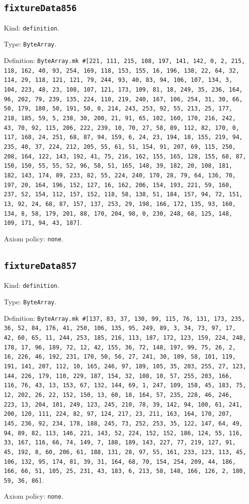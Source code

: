 \documentclass[11pt]{article}
\begin{document}
\subsection*{\texttt{fixtureData856}}
\noindent Kind: \texttt{definition}.\par
\noindent Type: \texttt{ByteArray}.\par
\noindent Definition: \texttt{ByteArray.mk \#[221, 111, 215, 108, 197, 141, 142, 0, 2, 215, 118, 162, 40, 93, 254, 169, 118, 153, 155, 16, 196, 138, 22, 64, 32, 114, 29, 118, 121, 121, 79, 244, 93, 40, 83, 94, 106, 107, 134, 3, 104, 223, 48, 23, 108, 107, 121, 173, 109, 81, 18, 249, 35, 236, 164, 96, 202, 79, 239, 135, 224, 110, 219, 240, 167, 106, 254, 31, 30, 66, 50, 179, 180, 50, 191, 50, 0, 214, 243, 253, 92, 55, 213, 25, 177, 218, 185, 59, 5, 238, 30, 200, 21, 91, 65, 102, 160, 170, 216, 242, 43, 70, 92, 115, 206, 222, 239, 10, 70, 27, 58, 89, 112, 82, 170, 0, 117, 168, 24, 251, 68, 87, 94, 159, 6, 24, 23, 194, 18, 155, 219, 94, 235, 40, 37, 224, 212, 205, 55, 61, 51, 154, 91, 207, 69, 115, 250, 208, 164, 122, 143, 192, 41, 75, 216, 162, 155, 165, 128, 155, 68, 87, 150, 150, 55, 55, 52, 96, 58, 51, 165, 148, 39, 182, 20, 108, 181, 182, 143, 174, 89, 233, 82, 55, 224, 240, 170, 28, 79, 64, 136, 70, 197, 20, 164, 196, 152, 127, 16, 162, 206, 154, 193, 221, 59, 160, 237, 52, 154, 112, 157, 152, 118, 58, 138, 51, 184, 157, 94, 72, 151, 13, 92, 24, 68, 87, 157, 137, 253, 29, 198, 166, 172, 135, 93, 160, 134, 8, 58, 179, 201, 88, 170, 204, 98, 0, 230, 248, 68, 125, 148, 109, 171, 94, 43, 187]}.\par
\noindent Axiom policy: \texttt{none}.\par
\subsection*{\texttt{fixtureData857}}
\noindent Kind: \texttt{definition}.\par
\noindent Type: \texttt{ByteArray}.\par
\noindent Definition: \texttt{ByteArray.mk \#[137, 83, 37, 130, 99, 115, 76, 131, 173, 235, 36, 52, 84, 176, 41, 250, 106, 135, 95, 249, 89, 3, 34, 73, 97, 17, 42, 60, 65, 11, 244, 253, 185, 216, 113, 187, 172, 123, 159, 224, 248, 178, 17, 96, 189, 72, 12, 42, 155, 36, 72, 148, 197, 99, 75, 26, 2, 16, 226, 46, 192, 231, 170, 50, 56, 27, 241, 30, 109, 58, 101, 119, 191, 141, 207, 112, 10, 165, 246, 97, 189, 105, 35, 203, 255, 27, 123, 144, 226, 179, 110, 229, 187, 154, 32, 108, 10, 57, 255, 203, 166, 116, 76, 43, 13, 153, 67, 132, 144, 69, 1, 247, 109, 158, 45, 183, 75, 12, 202, 26, 22, 152, 150, 13, 60, 18, 164, 57, 235, 228, 46, 246, 223, 13, 204, 101, 249, 123, 245, 210, 78, 39, 142, 94, 100, 61, 241, 200, 120, 111, 224, 82, 97, 124, 217, 23, 211, 163, 164, 170, 207, 145, 236, 92, 234, 178, 188, 245, 73, 252, 253, 35, 122, 147, 64, 49, 94, 89, 82, 113, 146, 221, 143, 52, 224, 152, 152, 186, 124, 55, 116, 33, 167, 116, 66, 74, 149, 7, 188, 189, 143, 227, 77, 219, 127, 91, 45, 192, 8, 60, 206, 61, 188, 131, 28, 97, 55, 161, 233, 123, 113, 45, 106, 132, 95, 174, 81, 39, 31, 164, 68, 70, 154, 254, 209, 44, 186, 166, 66, 51, 105, 25, 231, 43, 183, 6, 213, 58, 148, 166, 126, 2, 180, 59, 36, 86]}.\par
\noindent Axiom policy: \texttt{none}.\par
\end{document}
